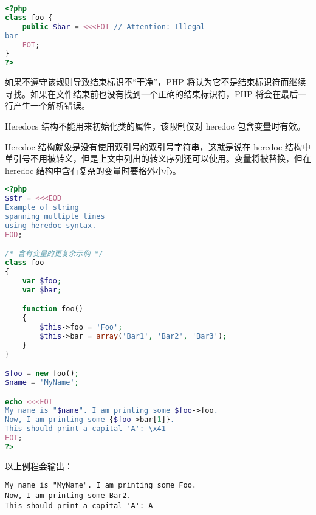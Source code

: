 \begin{lstlisting}[language=PHP]
<?php
class foo {
    public $bar = <<<EOT // Attention: Illegal
bar
    EOT;
}
?>
\end{lstlisting}

如果不遵守该规则导致结束标识不“干净”，PHP 将认为它不是结束标识符而继续寻找。如果在文件结束前也没有找到一个正确的结束标识符，PHP 将会在最后一行产生一个解析错误。

Heredocs 结构不能用来初始化类的属性，该限制仅对 heredoc 包含变量时有效。

Heredoc 结构就象是没有使用双引号的双引号字符串，这就是说在 heredoc 结构中单引号不用被转义，但是上文中列出的转义序列还可以使用。变量将被替换，但在 heredoc 结构中含有复杂的变量时要格外小心。


\begin{lstlisting}[language=PHP]
<?php
$str = <<<EOD
Example of string
spanning multiple lines
using heredoc syntax.
EOD;

/* 含有变量的更复杂示例 */
class foo
{
    var $foo;
    var $bar;

    function foo()
    {
        $this->foo = 'Foo';
        $this->bar = array('Bar1', 'Bar2', 'Bar3');
    }
}

$foo = new foo();
$name = 'MyName';

echo <<<EOT
My name is "$name". I am printing some $foo->foo.
Now, I am printing some {$foo->bar[1]}.
This should print a capital 'A': \x41
EOT;
?>
\end{lstlisting}

以上例程会输出：

\begin{verbatim}
My name is "MyName". I am printing some Foo.
Now, I am printing some Bar2.
This should print a capital 'A': A
\end{verbatim}

